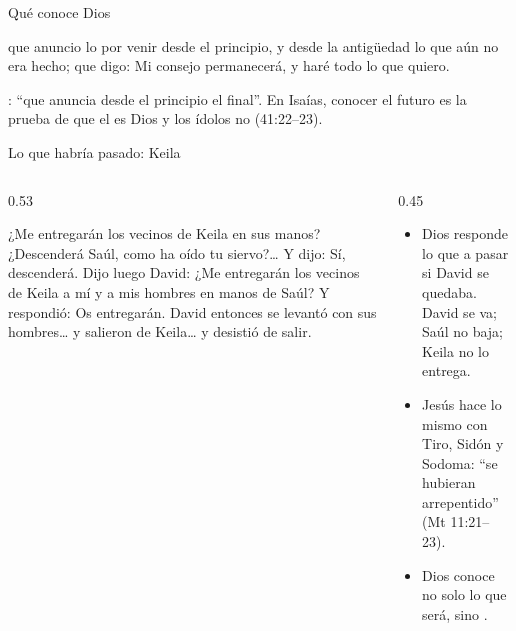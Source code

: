 \begin{frame}{Qué conoce Dios}
\centering
{}\par\medskip
\begin{cita}que anuncio lo por venir desde el principio, y desde la antigüedad lo que aún no era hecho; que digo: Mi consejo permanecerá, y haré todo lo que quiero.\end{cita}
\scriptsize{}: ``que anuncia desde el principio el final''. En Isaías, conocer el futuro es la prueba de que el \SENOR{} es Dios y los ídolos no (41:22--23).
\end{frame}

\begin{frame}{Lo que habría pasado: Keila}
\begin{columns}[t,onlytextwidth]
\begin{column}{0.53\textwidth}
\begin{cita}¿Me entregarán los vecinos de Keila en sus manos? ¿Descenderá Saúl, como ha oído tu siervo?\ldots{} Y \SENOR{} dijo: Sí, descenderá. Dijo luego David: ¿Me entregarán los vecinos de Keila a mí y a mis hombres en manos de Saúl? Y \SENOR{} respondió: Os entregarán. David entonces se levantó con sus hombres\ldots{} y salieron de Keila\ldots{} y desistió de salir.\end{cita}
\end{column}
\begin{column}{0.45\textwidth}\small
\begin{itemize}
\item Dios responde lo que  a pasar si David se quedaba. David se va; Saúl no baja; Keila no lo entrega.
\item Jesús hace lo mismo con Tiro, Sidón y Sodoma: ``se hubieran arrepentido'' (Mt 11:21--23).
\item Dios conoce no solo lo que será, sino .
\end{itemize}
\end{column}
\end{columns}
\end{frame}

